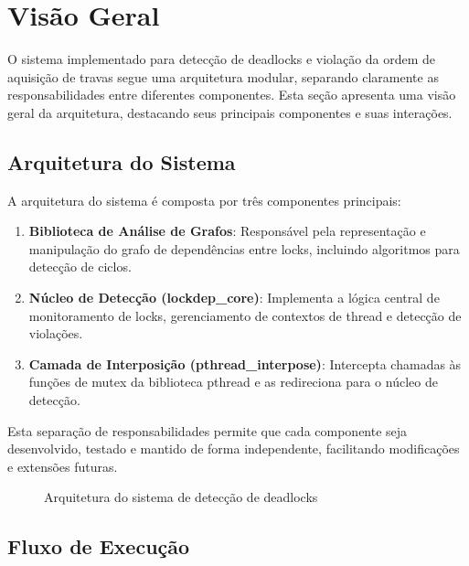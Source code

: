 \section{Visão Geral}\label{sec:visao_geral}

O sistema implementado para detecção de deadlocks e violação da ordem de aquisição de travas segue uma arquitetura modular, separando claramente as responsabilidades entre diferentes componentes. Esta seção apresenta uma visão geral da arquitetura, destacando seus principais componentes e suas interações.

\subsection{Arquitetura do Sistema}

A arquitetura do sistema é composta por três componentes principais:

\begin{enumerate}
    \item \textbf{Biblioteca de Análise de Grafos}: Responsável pela representação e manipulação do grafo de dependências entre locks, incluindo algoritmos para detecção de ciclos.

    \item \textbf{Núcleo de Detecção (lockdep\_core)}: Implementa a lógica central de monitoramento de locks, gerenciamento de contextos de thread e detecção de violações.

    \item \textbf{Camada de Interposição (pthread\_interpose)}: Intercepta chamadas às funções de mutex da biblioteca pthread e as redireciona para o núcleo de detecção.
\end{enumerate}

Esta separação de responsabilidades permite que cada componente seja desenvolvido, testado e mantido de forma independente, facilitando modificações e extensões futuras.

\begin{figure}[h]
    \centering
    \caption{Arquitetura do sistema de detecção de deadlocks}
    \label{fig:arquitetura}
\end{figure}

\subsection{Fluxo de Execução}

